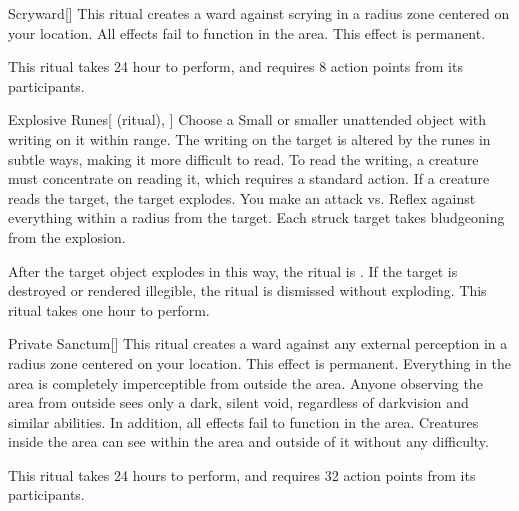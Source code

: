 \lowercase{\hypertarget{spell:Scryward}{}}\label{spell:Scryward}
\begin{apability}[\nth{2}]{\hypertarget{spell:Scryward}{Scryward}}[]
This ritual creates a ward against scrying in a \arealarge radius zone centered on your location.
All  effects fail to function in the area.
This effect is permanent.

This ritual takes 24 hour to perform, and requires 8 action points from its participants.
\end{apability}
\vspace{0.25em}



\lowercase{\hypertarget{spell:Explosive Runes}{}}\label{spell:Explosive Runes}
\begin{attuneability}[\nth{3}]{\hypertarget{spell:Explosive Runes}{Explosive Runes}}[ (ritual), ]
Choose a Small or smaller unattended object with writing on it within \rngclose range.
The writing on the target is altered by the runes in subtle ways, making it more difficult to read.
To read the writing, a creature must concentrate on reading it, which requires a standard action.
If a creature reads the target, the target explodes.
You make an attack vs. Reflex against everything within a \areamed radius from the target.
Each struck target takes bludgeoning  from the explosion.

After the target object explodes in this way, the ritual is .
If the target is destroyed or rendered illegible, the ritual is dismissed without exploding.
This ritual takes one hour to perform.
\end{attuneability}
\vspace{0.25em}



\lowercase{\hypertarget{spell:Private Sanctum}{}}\label{spell:Private Sanctum}
\begin{apability}[\nth{4}]{\hypertarget{spell:Private Sanctum}{Private Sanctum}}[]
This ritual creates a ward against any external perception in a \arealarge radius zone centered on your location.
This effect is permanent.
Everything in the area is completely imperceptible from outside the area.
Anyone observing the area from outside sees only a dark, silent void, regardless of darkvision and similar abilities.
In addition, all  effects fail to function in the area.
Creatures inside the area can see within the area and outside of it without any difficulty.

This ritual takes 24 hours to perform, and requires 32 action points from its participants.
\end{apability}
\vspace{0.25em}



